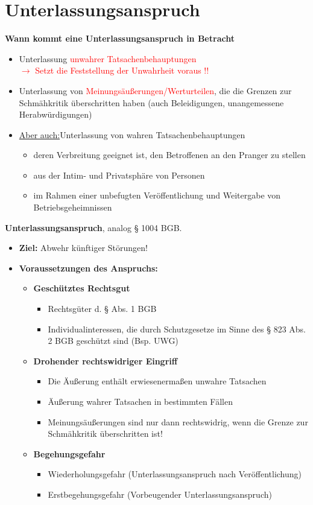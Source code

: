 \section{Unterlassungsanspruch}
\textbf{Wann kommt eine Unterlassungsanspruch in Betracht}
\begin{itemize}
    \item Unterlassung \textcolor{red}{unwahrer Tatsachenbehauptungen \\ $\rightarrow$ Setzt die Feststellung der Unwahrheit voraus !!} 
    \item Unterlassung von \textcolor{red}{Meinungsäußerungen/Werturteilen}, die die Grenzen zur Schmähkritik überschritten haben (auch Beleidigungen, unangemessene Herabwürdigungen)
    \item \underline{Aber auch:}Unterlassung von wahren Tatsachenbehauptungen
    \begin{itemize} 
        \item deren Verbreitung geeignet ist, den Betroffenen \glqq{}an den Pranger\grqq{} zu stellen
        \item aus der Intim- und Privatsphäre von Personen
        \item im Rahmen einer unbefugten Veröffentlichung und Weitergabe von Betriebsgeheimnissen
    \end{itemize}
\end{itemize}
\textbf{Unterlassungsanspruch}, analog § 1004 BGB.
\begin{itemize}
    \item \textbf{Ziel:} Abwehr künftiger Störungen!
    \item \textbf{Voraussetzungen des Anspruchs:}
    \begin{itemize}
        \item \textbf{Geschütztes Rechtsgut}
        \begin{itemize}
            \item Rechtsgüter d. § 
 Abs. 1 BGB
            \item Individualinteressen, die durch Schutzgesetze im Sinne des § 823 Abs. 2 BGB geschützt sind (Bsp. UWG)
        \end{itemize}
        \item \textbf{Drohender rechtswidriger Eingriff}
        \begin{itemize}
            \item Die Äußerung enthält erwiesenermaßen unwahre Tatsachen 
            \item Äußerung wahrer Tatsachen in bestimmten Fällen
            \item Meinungsäußerungen sind nur dann rechtswidrig, wenn die Grenze zur Schmähkritik überschritten ist!
        \end{itemize}
        \item \textbf{Begehungsgefahr}
        \begin{itemize}
            \item Wiederholungsgefahr (Unterlassungsanspruch nach Veröffentlichung)
            \item Erstbegehungsgefahr (Vorbeugender Unterlassungsanspruch)
        \end{itemize}
    \end{itemize}
\end{itemize}
